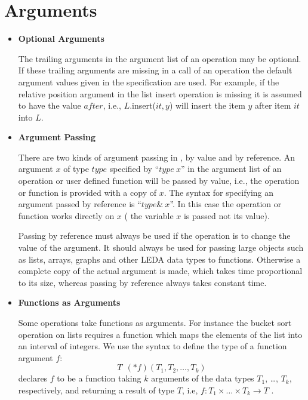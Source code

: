\section{Arguments}

\label{Arguments}
\begin{itemize}
\item{\bf Optional Arguments}

\smallskip
The trailing arguments in the argument list of an operation may be optional.
If these trailing arguments are missing in a call of an operation the default 
argument values given in the specification are used. For
example, if the relative position argument in the list insert operation
is missing it is assumed to have the value $after$, i.e.,
$L$.insert($it,y$) will insert the item \<$y$\> after item $it$ into $L$.

\item{\bf Argument Passing}

\smallskip
There are two kinds of argument passing in \CC, by value and by reference.
An argument $x$  of type $type$  specified by ``$type\ x$'' in the argument 
list of an operation or user defined function will be passed by value, i.e.,
the operation or function is provided with a copy of $x$.
The syntax for specifying an argument passed by reference is ``$type\&\ x$''.
In this case the operation or function works directly on $x$ ( the variable
$x$ is passed not its value).

Passing by reference must always be used if the operation is to change the
value of the argument. It should always be used for passing large objects
such as lists, arrays, graphs and other LEDA data types to functions.
Otherwise a complete copy of the actual argument is made, which takes time
proportional to its size, whereas  passing by reference always takes constant
time. 


\item{\bf Functions as Arguments}

\smallskip
Some operations take functions as arguments. For instance the bucket sort 
operation on lists requires a function which maps the elements of the list into
an interval of integers. We use the \CC syntax to define the type of a function
argument $f$:
$$T\ \ (*f)(T_1, T_2,\dots, T_k)$$ declares $f$ to be a function 
taking $k$ arguments of the data types $T_1$, \dots, $T_k$,
respectively, and returning a result of type $T$, i.e,
$f: T_1 \times \dots \times T_k \longrightarrow T$ .
\end{itemize}


